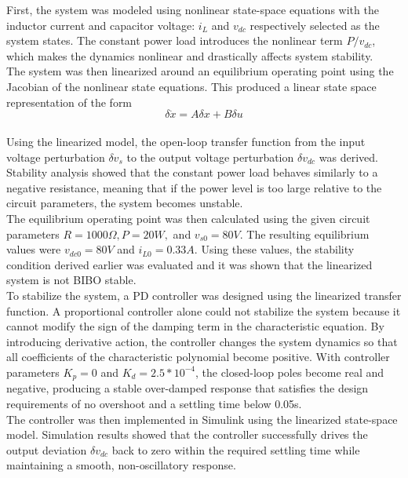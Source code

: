 \documentclass[12pt]{article}
\begin{document}
First, the system was modeled using nonlinear state-space equations with the inductor current and capacitor voltage: $i_L$ and $v_{dc}$ respectively selected as the system states. The constant power load introduces the nonlinear term $P/v_{dc}$, which makes the dynamics nonlinear and drastically affects system stability. \\

The system was then linearized around an equilibrium operating point using the Jacobian of the nonlinear state equations. This produced a linear state space representation of the form 
\[\delta \dot{x} = A\delta x + B\delta u\]
\\
Using the linearized model, the open-loop transfer function from the input voltage perturbation $\delta v_s$ to the output voltage perturbation $\delta v_{dc}$ was derived. Stability analysis showed that the constant power load behaves similarly to a negative resistance, meaning that if the power level is too large relative to the circuit parameters, the system becomes unstable.\\

The equilibrium operating point was then calculated using the given circuit parameters $R = 1000\Omega, P = 20W,$ and $v_{s0} = 80V$. The resulting equilibrium values were $v_{dc0} = 80V$ and $i_{L0} = 0.33A$. Using these values, the stability condition derived earlier was evaluated and it was shown that the linearized system is not BIBO stable.\\

To stabilize the system, a PD controller was designed using the linearized transfer function. A proportional controller alone could not stabilize the system because it cannot modify the sign of the damping term in the characteristic equation. By introducing derivative action, the controller changes the system dynamics so that all coefficients of the characteristic polynomial become positive. With controller parameters $K_p = 0$ and $K_d = 2.5*10^{-4}$, the closed-loop poles become real and negative, producing a stable over-damped response that satisfies the design requirements of no overshoot and a settling time below 0.05s. \\

The controller was then implemented in Simulink using the linearized state-space model. Simulation results showed that the controller successfully drives the output deviation $\delta v_{dc}$ back to zero within the required settling time while maintaining a smooth, non-oscillatory response.\\
\end{document}
